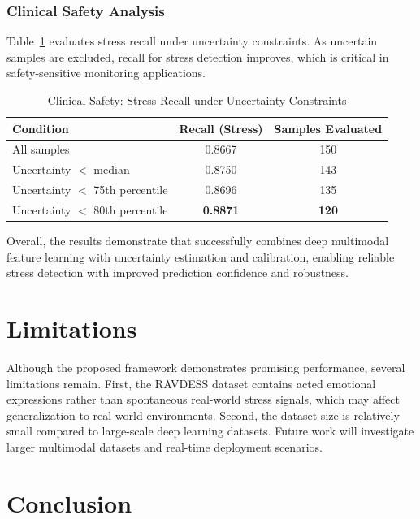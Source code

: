 \documentclass[conference]{IEEEtran}
\begin{document}
\subsubsection{Clinical Safety Analysis}

Table~\ref{tab:clinical_safety} evaluates stress recall under uncertainty constraints. As uncertain samples are excluded, recall for stress detection improves, which is critical in safety-sensitive monitoring applications.

\begin{table}[H]
\centering
\caption{Clinical Safety: Stress Recall under Uncertainty Constraints}
\label{tab:clinical_safety}
\footnotesize
\setlength{\tabcolsep}{3pt}
\renewcommand{\arraystretch}{1.0}
\begin{tabular}{lcc}
\hline
Condition & Recall (Stress) & Samples Evaluated \\
\hline
All samples & 0.8667 & 150 \\
Uncertainty $<$ median & 0.8750 & 143 \\
Uncertainty $<$ 75th percentile & 0.8696 & 135 \\
Uncertainty $<$ 80th percentile & \textbf{0.8871} & \textbf{120} \\
\hline
\end{tabular}
\end{table}

Overall, the results demonstrate that  successfully combines deep multimodal feature learning with uncertainty estimation and calibration, enabling reliable stress detection with improved prediction confidence and robustness.


\section{Limitations}

Although the proposed framework demonstrates promising performance, several limitations remain. 
First, the RAVDESS dataset contains acted emotional expressions rather than spontaneous real-world stress signals, which may affect generalization to real-world environments. 
Second, the dataset size is relatively small compared to large-scale deep learning datasets. 
Future work will investigate larger multimodal datasets and real-time deployment scenarios.
\section{Conclusion}
\end{document}
